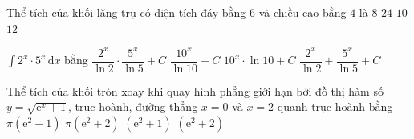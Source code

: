 \begin{ex}%
	Thể tích của khối lăng trụ có diện tích đáy bằng $6$ và chiều cao bằng $4$ là
	\choice
	{$8$}
	{\True $24$}
	{$10$}
	{$12$}
\end{ex}

\begin{ex}%
	$\displaystyle \int 2^x \cdot 5^x \, \mathrm{d}x$ bằng
	\choice
	{$\dfrac{2^x}{\ln 2} \cdot \dfrac{5^x}{\ln 5} + C$}
	{\True $\dfrac{10^x}{\ln 10} + C$}
	{$10^x \cdot \ln 10 + C$}
	{$\dfrac{2^x}{\ln 2} + \dfrac{5^x}{\ln 5} + C$}
\end{ex}

\begin{ex}%
	Thể tích của khối tròn xoay khi quay hình phẳng giới hạn bởi đồ thị hàm số $y = \sqrt{\mathrm{e}^x + 1}$, trục hoành, đường thẳng $x = 0$ và $x = 2$ quanh trục hoành bằng
	\choice
	{\True $\pi \left(\mathrm{e}^2 + 1 \right)$}
	{$\pi \left(\mathrm{e}^2 + 2 \right)$}
	{$\left(\mathrm{e}^2 + 1 \right)$}
	{$\left(\mathrm{e}^2 + 2 \right)$}
\end{ex}


